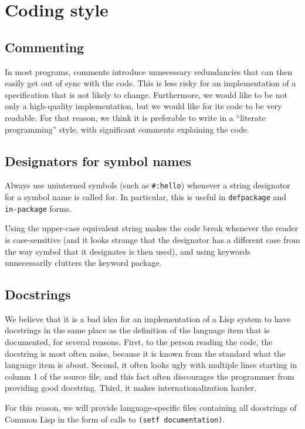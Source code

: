 \chapter{Coding style}

\section{Commenting}

In most programs, comments introduce unnecessary redundancies that can
then easily get out of sync with the code.  This is less risky for an
implementation of a specification that is not likely to change.
Furthermore, we would like \sysname{} to be not only a high-quality
implementation, but we would like for its code to be very readable.
For that reason, we think it is preferable to write \sysname{} in a
``literate programming'' style, with significant comments explaining
the code. 

\section{Designators for symbol names}

Always use uninterned symbols (such as \texttt{\#:hello}) whenever a
string designator for a symbol name is called for.  In particular,
this is useful in \texttt{defpackage} and \texttt{in-package} forms.

Using the upper-case equivalent string makes the code break whenever
the reader is case-sensitive (and it looks strange that the designator
has a different case from the way symbol that it designates is then
used), and using keywords unnecessarily clutters the keyword package.

\section{Docstrings}

We believe that it is a bad idea for an implementation of a Lisp
system to have docstrings in the same place as the definition of the
language item that is documented, for several reasons.  First, to the
person reading the code, the docstring is most often noise, because it
is known from the standard what the language item is about.  Second,
it often looks ugly with multiple lines starting in column 1 of the
source file, and this fact often discourages the programmer from
providing good docstring.  Third, it makes internationalization
harder.

For this reason, we will provide language-specific files containing
all docstrings of Common Lisp in the form of calls to \texttt{(setf
documentation)}. 

